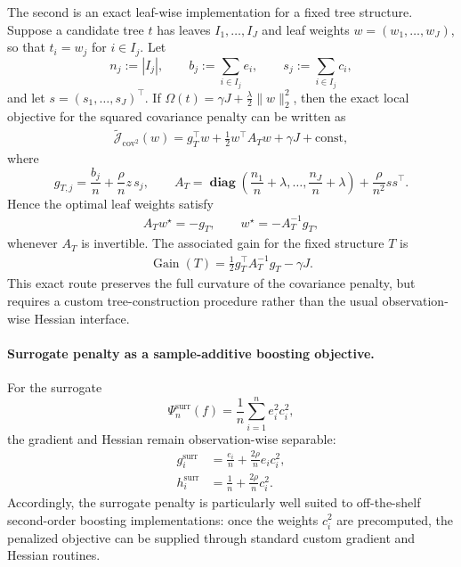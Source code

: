 \documentclass[12pt, draft]{article}
\theoremstyle{plain}
\theoremstyle{definition}
\newcommand{\1}{\mathbf{1}}
\newcommand{\diag}{\mathbf{\operatorname{diag}}}
\begin{document}
{The second is an exact leaf-wise implementation for a fixed tree structure. Suppose a candidate tree \(t\) has leaves \(I_1,\dots,I_J\) and leaf weights \(w=(w_1,\dots,w_J)\), so that \(t_i=w_j\) for \(i\in I_j\). Let
\[
n_j := |I_j|,
\qquad
b_j := \sum_{i\in I_j} e_i,
\qquad
s_j := \sum_{i\in I_j} c_i,
\]
and let \(s=(s_1,\dots,s_J)^\top\). If \(\Omega(t)=\gamma J + \frac{\lambda}{2}\|w\|_2^2\), then the exact local objective for the squared covariance penalty can be written as
\begin{align}
    \label{eq:boosting_cov2_exact_leaf_objective}
    \widetilde{\mathcal J}_{\mathrm{cov}^2}(w)
    =
    g_T^\top w
    +
    \frac{1}{2}w^\top A_T w
    +
    \gamma J
    + \text{const},
\end{align}
where
\[
g_{T,j}
=
\frac{b_j}{n}
+
\frac{\rho}{n}z\,s_j,
\qquad
A_T
=
\diag\!\left(\frac{n_1}{n}+\lambda,\dots,\frac{n_J}{n}+\lambda\right)
+
\frac{\rho}{n^2}ss^\top.
\]
Hence the optimal leaf weights satisfy
\begin{align}
    \label{eq:boosting_cov2_exact_leaf_system}
    A_T w^\star = -g_T,
    \qquad
    w^\star = -A_T^{-1}g_T,
\end{align}
whenever \(A_T\) is invertible. The associated gain for the fixed structure \(T\) is
\begin{align}
    \label{eq:boosting_cov2_exact_gain}
    \operatorname{Gain}(T)
    =
    \frac{1}{2}g_T^\top A_T^{-1}g_T - \gamma J.
\end{align}
This exact route preserves the full curvature of the covariance penalty, but requires a custom tree-construction procedure rather than the usual observation-wise Hessian interface.

\paragraph{Surrogate penalty as a sample-additive boosting objective.}
For the surrogate
\[
\Psi_n^{\mathrm{surr}}(f)
=
\frac{1}{n}\sum_{i=1}^n e_i^2 c_i^2,
\]
the gradient and Hessian remain observation-wise separable:
\begin{align}
    \label{eq:boosting_surr_grad_hess}
    g_i^{\mathrm{surr}}
    &=
    \frac{e_i}{n}
    +
    \frac{2\rho}{n}e_i c_i^2,
    \\
    h_i^{\mathrm{surr}}
    &=
    \frac{1}{n}
    +
    \frac{2\rho}{n}c_i^2.
\end{align}
Accordingly, the surrogate penalty is particularly well suited to off-the-shelf second-order boosting implementations: once the weights \(c_i^2\) are precomputed, the penalized objective can be supplied through standard custom gradient and Hessian routines.

}
\end{document}
